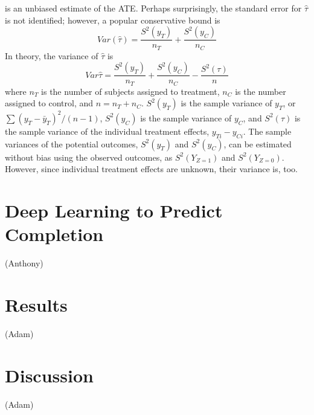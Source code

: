 \documentclass{edm_template}
\newcommand{\yti}{y_{Ti}}
\newcommand{\yci}{y_{Ci}}
\newcommand{\tauhat}{\hat{\tau}}
\begin{document}
is an unbiased estimate of the ATE. 
Perhaps surprisingly, the standard error for $\tauhat$ is not identified; however, a popular conservative bound \cite{neyman} is
\begin{equation}
Var(\tauhat)=\frac{S^2(y_T)}{n_T}+\frac{S^2(y_C)}{n_C}
\end{equation}
In theory, the variance of $\tauhat$ is
\begin{equation*}
Var{\tauhat}=\frac{S^2(y_T)}{n_T}+\frac{S^2(y_C)}{n_C}-\frac{S^2(\tau)}{n}
\end{equation*}
where $n_T$ is the number of subjects assigned to treatment, $n_C$ is the number assigned to control, and $n=n_T+n_C$. $S^2(y_T)$ is the sample variance of $y_T$, or $\sum (y_T-\bar{y}_T)^2/(n-1)$, $S^2(y_C)$ is the sample variance of $y_C$, and $S^2(\tau)$ is the sample variance of the individual treatment effects, $\yti-\yci$. 
The sample variances of the potential outcomes, $S^2(y_T)$ and $S^2(y_C)$, can be estimated without bias using the observed outcomes, as $S^2(Y_{Z=1})$ and $S^2(Y_{Z=0})$.
However, since individual treatment effects are unknown, their variance is, too. 


\section{Deep Learning to Predict Completion}
(Anthony)

\section{Results}
(Adam)

\section{Discussion}
(Adam)


  
\end{document}
